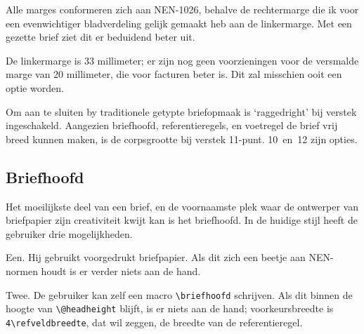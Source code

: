 Alle marges conformeren zich aan NEN-1026, behalve de                           
rechtermarge die ik voor een evenwichtiger bladverdeling                        
gelijk gemaakt heb aan de linkermarge.                                          
Met een gezette brief ziet dit er beduidend beter uit.                          
                                                                                
De linkermarge is 33 millimeter; er zijn nog geen voorzieningen                 
voor de versmalde marge van 20 millimeter, die voor facturen                    
beter is.                                                                       
Dit zal misschien ooit een optie worden.                                        
                                                                                
Om aan te sluiten by traditionele getypte briefopmaak                           
is `raggedright' bij verstek ingeschakeld.                                      
Aangezien briefhoofd, referentieregels, en voetregel de brief                   
vrij breed kunnen maken, is de corpsgrootte bij verstek 11-punt.                
10~en~12 zijn opties.                                                           
                                                                                
\subsection{Briefhoofd}                                                         
                                                                                
Het moeilijkste deel van een brief, en de voornaamste plek waar                 
de ontwerper van briefpapier zijn creativiteit kwijt kan                        
is het briefhoofd.                                                              
In de huidige stijl heeft de gebruiker drie mogelijkheden.                      
                                                                                
Een. Hij gebruikt voorgedrukt briefpapier. Als dit zich een                     
beetje aan NEN-normen houdt is er verder niets aan de hand.                     
                                                                                
Twee. De gebruiker kan zelf een macro \verb.\briefhoofd. schrijven.             
Als dit binnen de hoogte van                                                    
\verb.\@headheight. blijft, is er niets aan de hand;                            
voorkeursbreedte is \verb.4\refveldbreedte., dat wil zeggen, de                 
breedte van de referentieregel.                                                 
                                                                                
